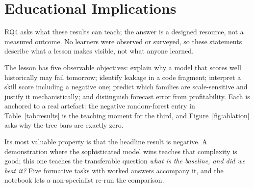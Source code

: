 \section{Educational Implications}
\label{sec:education}

RQ4 asks what these results can teach; the answer is a designed resource, not a
measured outcome. No learners were observed or surveyed, so these statements describe what a lesson
makes visible, not what anyone learned.

The lesson has five observable objectives: explain why a model that scores well
historically may fail tomorrow; identify leakage in a code fragment; interpret a
skill score including a negative one; predict which families are scale-sensitive
and justify it mechanistically; and distinguish forecast error from profitability.
Each is anchored to a real artefact: the negative random-forest entry in
Table~\ref{tab:results} is the teaching moment for the third, and
Figure~\ref{fig:ablation} asks why the tree bars are exactly zero.

Its most valuable property is that the headline result is negative. A demonstration
where the sophisticated model wins teaches that complexity is good; this one
teaches the transferable question \emph{what is the baseline, and did we beat it?}
Five formative tasks with worked answers accompany it, and the notebook lets a
non-specialist re-run the comparison.
